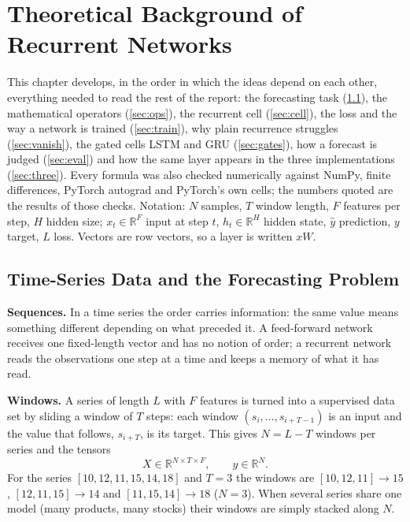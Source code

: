 \documentclass[11pt, a4paper]{article}
\begin{document}
\section{Theoretical Background of Recurrent Networks}

This chapter develops, in the order in which the ideas depend on each other, everything needed to read the rest of the report:
the forecasting task (\ref{sec:task}), the mathematical operators (\ref{sec:ops}), the recurrent cell (\ref{sec:cell}), the loss and the way a network is
trained (\ref{sec:train}), why plain recurrence struggles (\ref{sec:vanish}), the gated cells LSTM and GRU (\ref{sec:gates}), how a forecast is judged
(\ref{sec:eval}) and how the same layer appears in the three implementations (\ref{sec:three}). Every formula was also checked numerically against NumPy,
finite differences, PyTorch autograd and PyTorch's own cells; the numbers quoted are the results of those checks.
Notation: $N$ samples, $T$ window length, $F$ features per step, $H$ hidden size; $x_t\in\mathbb{R}^F$ input at step $t$, $h_t\in\mathbb{R}^H$ hidden state,
$\hat y$ prediction, $y$ target, $L$ loss. Vectors are row vectors, so a layer is written $xW$.

\subsection{Time-Series Data and the Forecasting Problem}
\label{sec:task}

\textbf{Sequences.} In a time series the order carries information: the same value means something different depending on what preceded it. A feed-forward network
receives one fixed-length vector and has no notion of order; a recurrent network reads the observations one step at a time and keeps a memory of what it has read.

\textbf{Windows.} A series of length $L$ with $F$ features is turned into a supervised data set by sliding a window of $T$ steps: each window
$(s_i,\dots,s_{i+T-1})$ is an input and the value that follows, $s_{i+T}$, is its target. This gives $N=L-T$ windows per series and the tensors
\begin{equation}
X\in\mathbb{R}^{N\times T\times F},\qquad y\in\mathbb{R}^{N}.
\end{equation}
For the series $[10,12,11,15,14,18]$ and $T=3$ the windows are $[10,12,11]\!\to\!15$, $[12,11,15]\!\to\!14$ and $[11,15,14]\!\to\!18$ ($N=3$).
When several series share one model (many products, many stocks) their windows are simply stacked along $N$.
\end{document}
